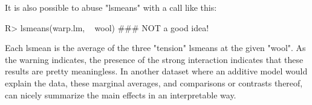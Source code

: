 \documentclass{article}
\begin{document}
It is also possible to abuse "lsmeans" with a call like this:
\begin{Winput}
R> lsmeans(warp.lm, ~ wool)   ### NOT a good idea!
\end{Winput}
Each lsmean is the average of the three "tension" lsmeans at the given "wool". As the warning indicates, the presence of the strong interaction indicates that these results are pretty meaningless. In another dataset where an additive model would explain the data, these marginal averages, and comparisons or contrasts thereof, can nicely summarize the main effects in an interpretable way.
\end{document}
